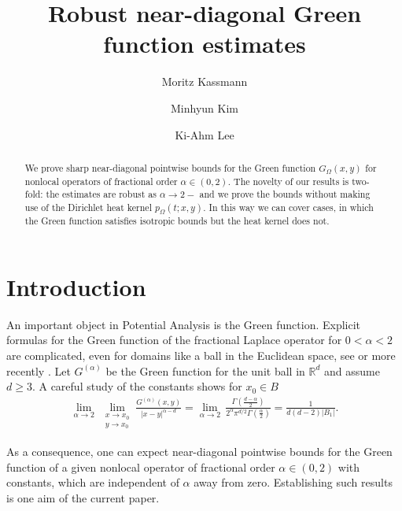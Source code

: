 \documentclass[reqno]{amsart}
\title[]{Robust near-diagonal Green function estimates}
\author{Moritz Kassmann}
\author{Minhyun Kim}
\author{Ki-Ahm Lee}
\theoremstyle{plain}
\theoremstyle{definition}
\numberwithin{equation}{section}
\newcommand{\R}{\mathbb{R}}
\begin{document}
\begin{abstract}
We prove sharp near-diagonal pointwise bounds for the Green function $G_\Omega(x,y)$ for nonlocal operators of fractional order $\alpha \in (0,2)$. The novelty of our results is two-fold: the estimates are robust as $\alpha \to 2-$ and we prove the bounds without making use of the Dirichlet heat kernel $p_\Omega(t;x,y)$. In this way we can cover cases, in which the Green function satisfies isotropic bounds but the heat kernel does not. 
\end{abstract}

\maketitle

\section{Introduction} \label{sec:introduction}


An important object in Potential Analysis is the Green function. Explicit formulas for the Green function of the fractional Laplace operator for $0 < \alpha < 2$ are complicated, even for domains like a ball in the Euclidean space, see \cite{Rie38, BGR61} or more recently \cite{Buc16}. Let $G^{(\alpha)}$ be the Green function for the unit ball in $\R^d$ and assume $d \geq 3$. A careful study of the constants shows for $x_0 \in B$
\begin{align*}
\lim\limits_{\alpha \to 2} \, \lim\limits_{\substack{x \to x_0 \\ y \to x_0}} \frac{G^{(\alpha)} (x,y)}{|x-y|^{\alpha -d}} = \lim\limits_{\alpha \to 2} \, \frac{\Gamma(\frac{d-\alpha}{2})}{2^\alpha \pi^{d/2} \Gamma(\frac{\alpha}{2})} = \frac{1}{d(d-2)|B_1|}.
\end{align*}

As a consequence, one can expect near-diagonal pointwise bounds for the Green function of a given nonlocal operator of fractional order $\alpha \in (0,2)$ with constants, which are independent of $\alpha$ away from zero. Establishing such results is one aim of the current paper. 
\end{document}
